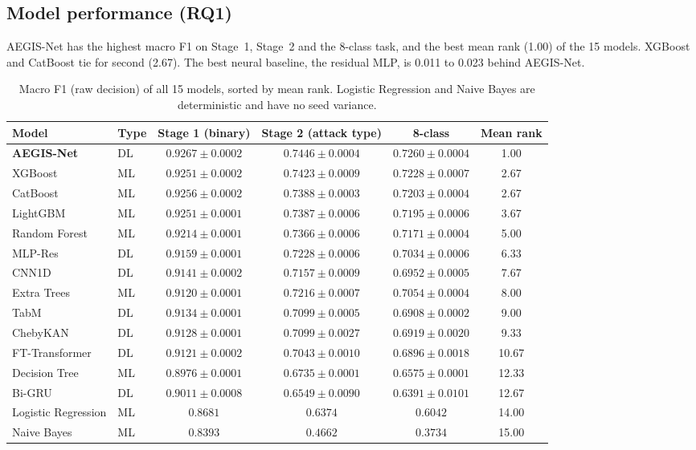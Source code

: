 \documentclass[11pt,a4paper]{article}
\newcommand{\aegis}{AEGIS-Net}
\begin{document}
\subsection{Model performance (RQ1)}\label{sec:main}
\aegis{} has the highest macro F1 on Stage~1, Stage~2 and the 8-class task, and the best mean rank (1.00) of the 15 models. XGBoost and CatBoost tie for second (2.67). The best neural baseline, the residual MLP, is 0.011 to 0.023 behind \aegis.

\begin{table}[h]
\centering\small
\caption{Macro F1 (raw decision) of all 15 models, sorted by mean rank. Logistic Regression and Naive Bayes are deterministic and have no seed variance.}\label{tab:main}
\begin{tabular}{@{}llcccc@{}}
\toprule
Model & Type & Stage 1 (binary) & Stage 2 (attack type) & 8-class & Mean rank \\
\midrule
\textbf{\aegis}      & DL & $0.9267\pm0.0002$ & $0.7446\pm0.0004$ & $0.7260\pm0.0004$ & 1.00 \\
XGBoost              & ML & $0.9251\pm0.0002$ & $0.7423\pm0.0009$ & $0.7228\pm0.0007$ & 2.67 \\
CatBoost             & ML & $0.9256\pm0.0002$ & $0.7388\pm0.0003$ & $0.7203\pm0.0004$ & 2.67 \\
LightGBM             & ML & $0.9251\pm0.0001$ & $0.7387\pm0.0006$ & $0.7195\pm0.0006$ & 3.67 \\
Random Forest        & ML & $0.9214\pm0.0001$ & $0.7366\pm0.0006$ & $0.7171\pm0.0004$ & 5.00 \\
MLP-Res              & DL & $0.9159\pm0.0001$ & $0.7228\pm0.0006$ & $0.7034\pm0.0006$ & 6.33 \\
CNN1D                & DL & $0.9141\pm0.0002$ & $0.7157\pm0.0009$ & $0.6952\pm0.0005$ & 7.67 \\
Extra Trees          & ML & $0.9120\pm0.0001$ & $0.7216\pm0.0007$ & $0.7054\pm0.0004$ & 8.00 \\
TabM                 & DL & $0.9134\pm0.0001$ & $0.7099\pm0.0005$ & $0.6908\pm0.0002$ & 9.00 \\
ChebyKAN             & DL & $0.9128\pm0.0001$ & $0.7099\pm0.0027$ & $0.6919\pm0.0020$ & 9.33 \\
FT-Transformer       & DL & $0.9121\pm0.0002$ & $0.7043\pm0.0010$ & $0.6896\pm0.0018$ & 10.67 \\
Decision Tree        & ML & $0.8976\pm0.0001$ & $0.6735\pm0.0001$ & $0.6575\pm0.0001$ & 12.33 \\
Bi-GRU               & DL & $0.9011\pm0.0008$ & $0.6549\pm0.0090$ & $0.6391\pm0.0101$ & 12.67 \\
Logistic Regression  & ML & $0.8681$ & $0.6374$ & $0.6042$ & 14.00 \\
Naive Bayes          & ML & $0.8393$ & $0.4662$ & $0.3734$ & 15.00 \\
\bottomrule
\end{tabular}
\end{table}
\end{document}
